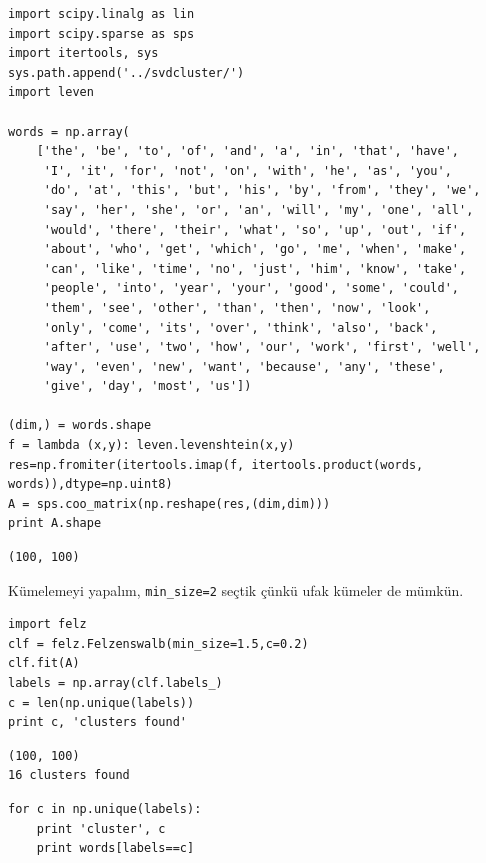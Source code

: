 \documentclass[12pt,fleqn]{article}\usepackage{../../common}
\begin{document}
\begin{verbatim}
import scipy.linalg as lin
import scipy.sparse as sps
import itertools, sys
sys.path.append('../svdcluster/')
import leven

words = np.array(
    ['the', 'be', 'to', 'of', 'and', 'a', 'in', 'that', 'have',
     'I', 'it', 'for', 'not', 'on', 'with', 'he', 'as', 'you',
     'do', 'at', 'this', 'but', 'his', 'by', 'from', 'they', 'we',
     'say', 'her', 'she', 'or', 'an', 'will', 'my', 'one', 'all',
     'would', 'there', 'their', 'what', 'so', 'up', 'out', 'if',
     'about', 'who', 'get', 'which', 'go', 'me', 'when', 'make',
     'can', 'like', 'time', 'no', 'just', 'him', 'know', 'take',
     'people', 'into', 'year', 'your', 'good', 'some', 'could',
     'them', 'see', 'other', 'than', 'then', 'now', 'look',
     'only', 'come', 'its', 'over', 'think', 'also', 'back',
     'after', 'use', 'two', 'how', 'our', 'work', 'first', 'well',
     'way', 'even', 'new', 'want', 'because', 'any', 'these',
     'give', 'day', 'most', 'us'])

(dim,) = words.shape
f = lambda (x,y): leven.levenshtein(x,y)
res=np.fromiter(itertools.imap(f, itertools.product(words, words)),dtype=np.uint8)
A = sps.coo_matrix(np.reshape(res,(dim,dim)))
print A.shape
\end{verbatim}

\begin{verbatim}
(100, 100)
\end{verbatim}

Kümelemeyi yapalım, \verb!min_size=2! seçtik çünkü ufak kümeler de mümkün.

\begin{verbatim}
import felz
clf = felz.Felzenswalb(min_size=1.5,c=0.2)
clf.fit(A)
labels = np.array(clf.labels_)
c = len(np.unique(labels))
print c, 'clusters found'
\end{verbatim}

\begin{verbatim}
(100, 100)
16 clusters found
\end{verbatim}

\begin{verbatim}
for c in np.unique(labels):
    print 'cluster', c
    print words[labels==c]
\end{verbatim}
\end{document}
